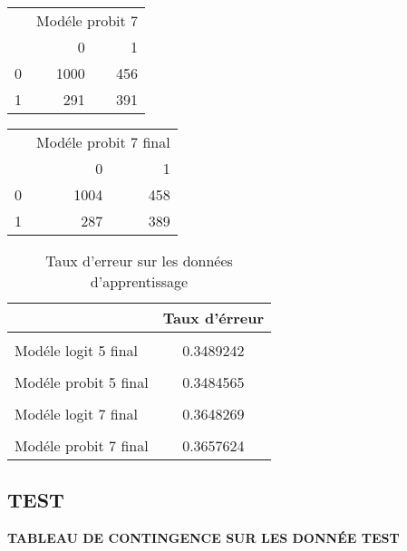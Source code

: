\documentclass[
  14pt,
  french,
]{article}
\begin{document}
\begin{center}
\begin{tabular}{l|r|r}
\hline
\multicolumn{1}{c|}{ } & \multicolumn{2}{c}{Modéle probit 7 } \\
\cline{2-3}
  & 0 & 1\\
\hline
0 & 1000 & 456\\
\hline
1 & 291 & 391\\
\hline
\end{tabular}


\begin{tabular}{l|r|r}
\hline
\multicolumn{1}{c|}{ } & \multicolumn{2}{c}{Modéle probit 7 final} \\
\cline{2-3}
  & 0 & 1\\
\hline
0 & 1004 & 458\\
\hline
1 & 287 & 389\\
\hline
\end{tabular}


\begin{table}[!h]

\caption{\label{tab:TRREURA}Taux d'erreur sur les données d'apprentissage}
\centering
\fontsize{10}{12}\selectfont
\begin{tabular}[t]{l|c}
\hline
  & Taux d'érreur\\
\hline
\cellcolor{gray!6}{Modéle logit 5} & \cellcolor{gray!6}{0.3503274}\\
\hline
Modéle logit 5 final & 0.3489242\\
\hline
\cellcolor{gray!6}{Modéle probit 5} & \cellcolor{gray!6}{0.3493920}\\
\hline
Modéle probit 5 final & 0.3484565\\
\hline
\cellcolor{gray!6}{Modéle logit 7} & \cellcolor{gray!6}{0.3601497}\\
\hline
Modéle logit 7 final & 0.3648269\\
\hline
\cellcolor{gray!6}{Modéle probit 7} & \cellcolor{gray!6}{0.3620206}\\
\hline
Modéle probit 7 final & 0.3657624\\
\hline
\end{tabular}
\end{table}
\end{center}

\hypertarget{test}{%
\subsection{TEST}\label{test}}

\textbf{TABLEAU DE CONTINGENCE SUR LES DONNÉE TEST}
\end{document}
